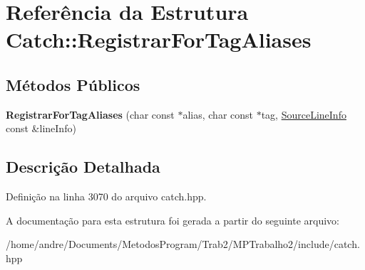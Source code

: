 \hypertarget{structCatch_1_1RegistrarForTagAliases}{}\section{Referência da Estrutura Catch\+:\+:Registrar\+For\+Tag\+Aliases}
\label{structCatch_1_1RegistrarForTagAliases}
\subsection*{Métodos Públicos}
\begin{DoxyCompactItemize}
\item 
{\bfseries Registrar\+For\+Tag\+Aliases} (char const $\ast$alias, char const $\ast$tag, \hyperlink{structCatch_1_1SourceLineInfo}{Source\+Line\+Info} const \&line\+Info)\hypertarget{structCatch_1_1RegistrarForTagAliases_ae4e45830e4763bcd65d55d8db9167b69}{}\label{structCatch_1_1RegistrarForTagAliases_ae4e45830e4763bcd65d55d8db9167b69}

\end{DoxyCompactItemize}


\subsection{Descrição Detalhada}


Definição na linha 3070 do arquivo catch.\+hpp.



A documentação para esta estrutura foi gerada a partir do seguinte arquivo\+:\begin{DoxyCompactItemize}
\item 
/home/andre/\+Documents/\+Metodos\+Program/\+Trab2/\+M\+P\+Trabalho2/include/catch.\+hpp\end{DoxyCompactItemize}
